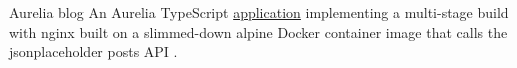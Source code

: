 \datedsubsectionnarrow{}
{Aurelia blog}
{}
{An Aurelia TypeScript  \href{https://github.com/JacobArchambault/aurelia-blog}{application} implementing a multi-stage build with nginx built on a slimmed-down alpine Docker container image that calls the jsonplaceholder posts API .}
